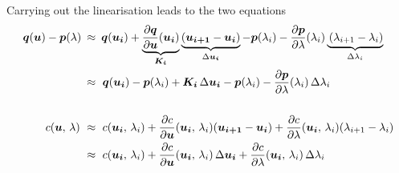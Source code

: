 Carrying out the linearisation leads to the two equations
%
\begin{align}
\boldsymbol{q}(\boldsymbol{u}) - \boldsymbol{p}(\lambda)\:&\approx\:\boldsymbol{q}(\boldsymbol{u_{i}}) + \underbrace{
\frac{\partial \boldsymbol{q}}{\partial \boldsymbol{u}}(\boldsymbol{u_{i}})
}_{\boldsymbol{K_{i}}}
\underbrace{
(\boldsymbol{u_{i+1}} - \boldsymbol{u_{i}})
}_{\Delta\boldsymbol{u_{i}}} - \boldsymbol{p}(\lambda_i) - \frac{\partial \boldsymbol{p}}{\partial \lambda}(\lambda_i)
\underbrace{
\,(\lambda_{i+1} - \lambda_{i})
}_{\Delta \lambda_{i}}
\notag\\
&\approx\ \boldsymbol{q}(\boldsymbol{u_{i}}) - \boldsymbol{p}(\lambda_i) + \boldsymbol{K_{i}}\,\Delta\boldsymbol{u_{i}} - \boldsymbol{p}(\lambda_i) - \frac{\partial \boldsymbol{p}}{\partial \lambda}(\lambda_i)\,\Delta \lambda_{i}\label{eq:equilibrium_dc_lin}\\
\notag\\
c(\boldsymbol{u},\,\lambda) \ &\approx\ c(\boldsymbol{u_{i}},\,\lambda_{i}) + \frac{\partial c}{\partial \boldsymbol{u}}(\boldsymbol{u_{i}},\,\lambda_{i})(\boldsymbol{u_{i+1}} - \boldsymbol{u_{i}}) + \frac{\partial c}{\partial \lambda}(\boldsymbol{u_{i}},\,\lambda_{i})(\lambda_{i+1} - \lambda_{i})\notag\\
&\approx\ c(\boldsymbol{u_{i}},\,\lambda_{i}) + \frac{\partial c}{\partial \boldsymbol{u}}(\boldsymbol{u_{i}},\,\lambda_{i})\,\Delta\boldsymbol{u_{i}} + \frac{\partial c}{\partial \lambda}(\boldsymbol{u_{i}},\,\lambda_{i})\,\Delta \lambda_{i}\label{eq:constraints_dc_lin}
\end{align}

